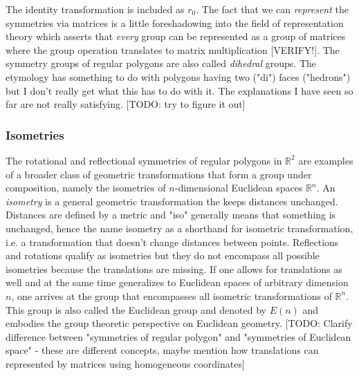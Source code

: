 The identity transformation is included as $r_0$. The fact that we can \emph{represent} the symmetries via matrices is a little foreshadowing into the field of representation theory which asserts that \emph{every} group can be represented as a group of matrices where the group operation translates to matrix multiplication [VERIFY!]. The symmetry groups of regular polygons are also called \emph{dihedral} groups. The etymology has something to do with polygons having two ("di") faces ("hedrons") but I don't really get what this has to do with it. The explanations I have seen so far are not really satisfying. [TODO: try to figure it out]





\subsubsection{Isometries}
The rotational and reflectional symmetries of regular polygons in $\mathbb{R}^2$ are examples of a broader class of geometric transformations that form a group under composition, namely the isometries of $n$-dimensional Euclidean spaces $\mathbb{R}^n$. An \emph{isometry} is a general geometric transformation the keeps distances unchanged. Distances are defined by a metric and "iso" generally means that something is unchanged, hence the name isometry as a shorthand for isometric transformation, i.e. a transformation that doesn't change distances between points. Reflections and rotations qualify as isometries but they do not encompass all possible isometries because the translations are missing. If one allows for translations as well and at the same time generalizes to Euclidean spaces of arbitrary dimension $n$, one arrives at the group that encompasses all isometric transformations of $\mathbb{R}^n$. This group is also called the Euclidean group and denoted by $E(n)$ and embodies the group theoretic perspective on Euclidean geometry. [TODO: Clarify difference between "symmetries of regular polygon" and "symmetries of Euclidean space" - these are different concepts, maybe mention how translations can represented by matrices using homogeneous coordinates]

